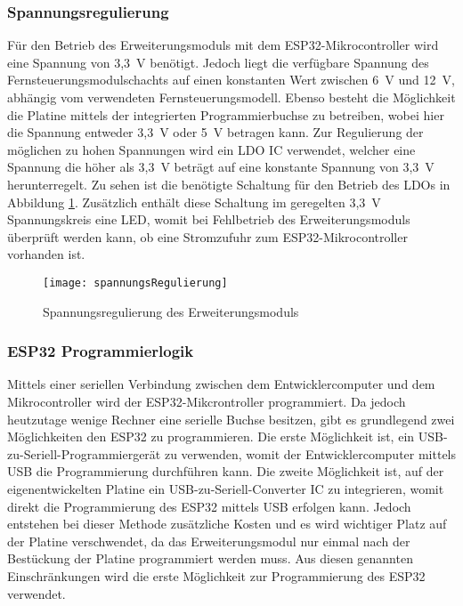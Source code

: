 \subsubsection{Spannungsregulierung}
Für den Betrieb des Erweiterungsmoduls mit dem ESP32-Mikrocontroller wird eine Spannung von 3,3~V benötigt. Jedoch liegt die verfügbare Spannung des Fernsteuerungsmodulschachts auf einen konstanten Wert zwischen 6~V und 12~V, abhängig vom verwendeten Fernsteuerungsmodell. Ebenso besteht die Möglichkeit die Platine mittels der integrierten Programmierbuchse zu betreiben, wobei hier die Spannung entweder 3,3~V oder 5~V betragen kann. Zur Regulierung der möglichen zu hohen Spannungen wird ein \ac{LDO} \ac{IC} verwendet, welcher eine Spannung die höher als 3,3~V beträgt auf eine konstante Spannung von 3,3~V herunterregelt. Zu sehen ist die benötigte Schaltung für den Betrieb des \acp{LDO} in Abbildung \ref{fig:spannungsRegulierung}. Zusätzlich enthält diese Schaltung im geregelten 3,3~V Spannungskreis eine \acs{LED}, womit bei Fehlbetrieb des Erweiterungsmoduls überprüft werden kann, ob eine Stromzufuhr zum ESP32-Mikrocontroller vorhanden ist.

\begin{figure}[h]
    \centering
    \texttt{[image: spannungsRegulierung]}
    \caption{Spannungsregulierung des Erweiterungsmoduls}
    \label{fig:spannungsRegulierung}
\end{figure}

\subsubsection{ESP32 Programmierlogik}
Mittels einer seriellen Verbindung zwischen dem Entwicklercomputer und dem Mikrocontroller wird der ESP32-Mikcrontroller programmiert. Da jedoch heutzutage wenige Rechner eine serielle Buchse besitzen, gibt es grundlegend zwei Möglichkeiten den ESP32 zu programmieren. Die erste Möglichkeit ist, ein USB-zu-Seriell-Programmiergerät zu verwenden, womit der Entwicklercomputer mittels USB die Programmierung durchführen kann. Die zweite Möglichkeit ist, auf der eigenentwickelten Platine ein USB-zu-Seriell-Converter \ac{IC} zu integrieren, womit direkt die Programmierung des ESP32 mittels USB erfolgen kann. Jedoch entstehen bei dieser Methode zusätzliche Kosten und es wird wichtiger Platz auf der Platine verschwendet, da das Erweiterungsmodul nur einmal nach der Bestückung der Platine programmiert werden muss. Aus diesen genannten Einschränkungen wird die erste Möglichkeit zur Programmierung des ESP32 verwendet.

